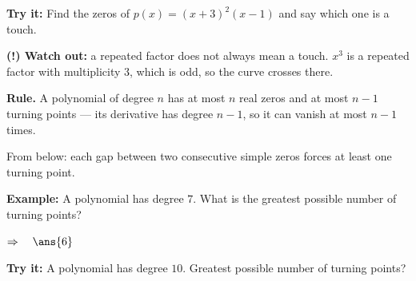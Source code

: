 \documentclass[12pt]{article}
\begin{document}
\begin{tryitbox}
\textbf{Try it:} \quad Find the zeros of $p(x) = (x + 3)^{2}(x - 1)$ and say which one is a touch.\\[2pt]
\end{tryitbox}

\begin{watchoutbox}
\textbf{(!) Watch out:} a repeated factor does not always mean a touch. $x^{3}$ is a repeated factor with multiplicity $3$, which is odd, so the curve crosses there.
\end{watchoutbox}


\begin{formulabox}
\textbf{Rule.} A polynomial of degree $n$ has at most $n$ real zeros and at most $n - 1$ turning points --- its derivative has degree $n - 1$, so it can vanish at most $n - 1$ times.\par
From below: each gap between two consecutive simple zeros forces at least one turning point.
\end{formulabox}

\begin{examplebox}
\textbf{Example:} \quad A polynomial has degree $7$. What is the greatest possible number of turning points?

$\Rightarrow\quad \ans{6}$
\end{examplebox}

\begin{tryitbox}
\textbf{Try it:} \quad A polynomial has degree $10$. Greatest possible number of turning points?\\[2pt]
\end{tryitbox}
\end{document}
